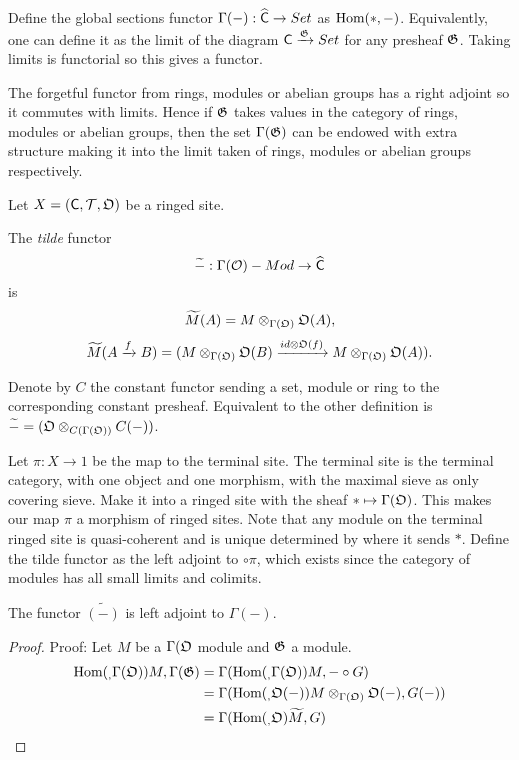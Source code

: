\begin{definition}
Define the global sections functor $\Gamma(-):\widehat{{\mathsf{C}}}\rightarrow Set$ as $\mbox{Hom}(\ast,- )$.
Equivalently, one can define it as the limit of the diagram ${\mathsf{C}}\xrightarrow{\mathfrak{G}} Set$ for any presheaf $\mathfrak{G}$.
Taking limits is functorial so this gives a functor.
\end{definition}
\begin{remark}
The forgetful functor from rings, modules or abelian groups has a right adjoint so it commutes with limits.
Hence if $\mathfrak{G}$ takes values in the category of rings,
modules or abelian groups, then the set $\Gamma(\mathfrak{G})$ can be endowed with extra structure making it into the limit taken of
rings, modules or abelian groups respectively. 
\end{remark}


Let $X = ({\mathsf{C}},{\mathcal{T}},\mathfrak{O})$ be a ringed site.

\begin{definition}
The \emph{tilde} functor 
\[\widetilde{-}:\Gamma(\mathcal{O})-Mod\rightarrow \widehat{{\mathsf{C}}}\]
is 
\[\widetilde{M}(A) = M \otimes_{\Gamma(\mathfrak{O})} \mathfrak{O}(A),\]
\[\widetilde{M}( A\xrightarrow{f} B) = 
(M \otimes_{\Gamma(\mathfrak{O})} \mathfrak{O}(B) 
\xrightarrow{id \otimes \mathfrak{O}(f)} 
M \otimes_{\Gamma(\mathfrak{O})} \mathfrak{O}(A)).\]

Denote by $C$ the constant functor sending a set, module or ring to the corresponding constant presheaf.
Equivalent to the other definition is $\widetilde{-} = (\mathfrak{O} \otimes_{C(\Gamma(\mathfrak{O}))} C(-))$.

Let $\pi: X \rightarrow 1$ be the map to the terminal site. 
The terminal site is the terminal category, with one object and one morphism, with the maximal sieve as only covering sieve. 
Make it into a ringed site with the sheaf $\ast \mapsto \Gamma(\mathfrak{O})$. This makes our map $\pi$ a morphism of ringed sites.
Note that any module on the terminal ringed site is quasi-coherent and is unique determined by where it sends $\ast$.
Define the tilde functor as the left adjoint to $\circ \pi$, which exists since the category of modules has all small limits and colimits.
\end{definition}

\begin{lemma}
The functor $\widetilde{(-)}$ is left adjoint to $\Gamma(-)$.
\end{lemma}
\begin{proof}
Proof: Let $M$ be a $\Gamma(\mathfrak{O}$ module and $\mathfrak{G}$ a  module.
\begin{align*}
\mbox{Hom}(_,\Gamma(\mathfrak{O})){M,\Gamma(\mathfrak{G})} & = \Gamma(\mbox{Hom}(_,\Gamma(\mathfrak{O})){M,-} \circ G)\\
&= \Gamma(\mbox{Hom}(_,\mathfrak{O}(-)){M\otimes_{\Gamma(\mathfrak{O})} \mathfrak{O}(-),G(-)})\\
&= \Gamma(\mbox{Hom}(_,\mathfrak{O}){\widetilde{M}, G})
\end{align*}
\end{proof}

